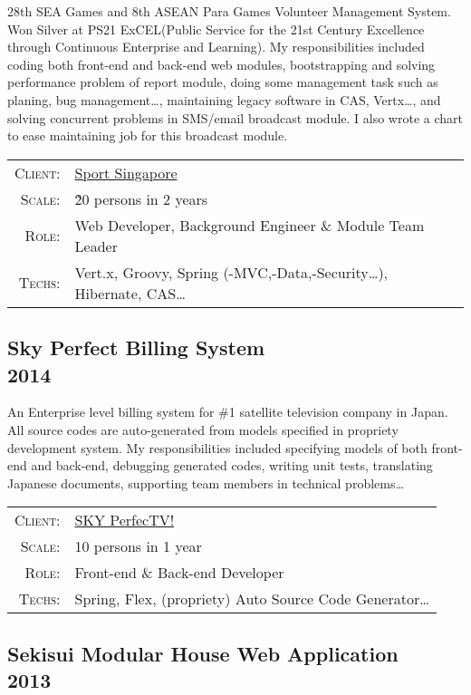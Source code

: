 \documentclass[a4paper,10pt]{article}
\begin{document}
28th SEA Games and 8th ASEAN Para Games Volunteer Management System.
Won Silver at PS21 ExCEL(Public Service for the 21st Century Excellence through Continuous Enterprise and Learning).
My responsibilities included coding both front-end and back-end web modules,
bootstrapping and solving performance problem of report module,
doing some management task such as planing, bug management\ldots,
maintaining legacy software in CAS, Vertx\ldots,
and solving concurrent problems in SMS/email broadcast module.
I also wrote a chart to ease maintaining job for this broadcast module.

\begin{tabular}{rl}
    \textsc{Client:} & \href{http://www.sportsingapore.gov.sg/}{Sport Singapore}\\
    \textsc{Scale:} & \~20 persons in 2 years\\
    \textsc{Role:} & Web Developer, Background Engineer \& Module Team Leader\\
    \textsc{Techs:} & Vert.x, Groovy, Spring (-MVC,-Data,-Security\ldots), Hibernate, CAS\ldots\\
\end{tabular}


\subsection*{Sky Perfect Billing System\\\small 2014}

An Enterprise level billing system for \#1 satellite television company in Japan.
All source codes are auto-generated from models specified in propriety development system.
My responsibilities included specifying models of both front-end and back-end, debugging generated codes, writing unit tests,
translating Japanese documents, supporting team members in technical problems\ldots

\begin{tabular}{rl}
    \textsc{Client:} & \href{https://www.skyperfectv.co.jp/eng/}{SKY PerfecTV!}\\
    \textsc{Scale:} & 10 persons in 1 year\\
    \textsc{Role:} & Front-end \& Back-end Developer\\
    \textsc{Techs:} & Spring, Flex, (propriety) Auto Source Code Generator\ldots\\
\end{tabular}

\subsection*{Sekisui Modular House Web Application\\\small 2013}
\end{document}

